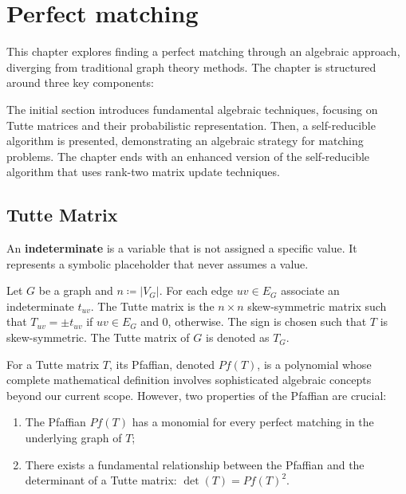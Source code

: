 \chapter{Perfect matching}
\label{chap:perfect_matching}

This chapter explores finding a perfect matching through an algebraic approach, diverging from traditional graph theory methods. The chapter is structured around three key components:

The initial section introduces fundamental algebraic techniques, focusing on Tutte matrices and their probabilistic representation. 
Then, a self-reducible algorithm is presented, demonstrating an algebraic strategy for matching problems. 
The chapter ends with an enhanced version of the self-reducible algorithm that uses rank-two matrix update techniques. 

\section{Tutte Matrix}

\begin{definition}[Indeterminates]
    An \textbf{indeterminate} is a variable that is not assigned a specific value. It represents a symbolic placeholder that never assumes a value.
\end{definition}

\begin{definition}
\label{def:tutte_matrix}
    Let \(G\) be a graph and \(n \coloneqq |V_G|\).
    For each edge \(uv \in E_G\) associate an indeterminate \(t_{uv}\).
    The Tutte matrix is the \(n \times n\) skew-symmetric matrix such that \(T_{uv} = \pm t_{uv}\) if \(uv \in E_G\) and \(0\), otherwise.
    The sign is chosen such that \(T\) is skew-symmetric.
    The Tutte matrix of \(G\) is denoted as \(T_G\).
\end{definition}

For a Tutte matrix \(T\), its Pfaffian, denoted \(Pf(T)\), is a polynomial whose complete mathematical definition involves sophisticated algebraic concepts beyond our current scope. 
However, two properties of the Pfaffian are crucial:
\begin{enumerate}
    \item The Pfaffian \(Pf(T)\) has a monomial for every perfect matching in the underlying graph of \(T\);
    \item There exists a fundamental relationship between the Pfaffian and the determinant of a Tutte matrix: \(\det(T) = Pf(T)^2\). 
\end{enumerate}

